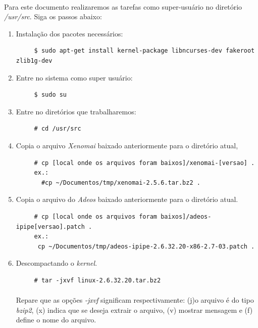 \documentclass[a4paper,10pt]{article}
\begin{document}
  \paragraph{}
    Para este documento realizaremos as tarefas como super-usuário no diretório \emph{/usr/src}. Siga os passos abaixo:
    \begin{enumerate}
      \item Instalação dos pacotes necessários:
	\begin{lstlisting}
	 $ sudo apt-get install kernel-package libncurses-dev fakeroot zlib1g-dev
	\end{lstlisting}

      \item Entre no sistema como super usuário:
	\begin{lstlisting}
	 $ sudo su 
	\end{lstlisting}

      \item Entre no diretórios que trabalharemos:
	\begin{lstlisting}
	 # cd /usr/src
	\end{lstlisting}

      \item Copia o arquivo \emph{Xenomai} baixado anteriormente para o diretório atual,
	\begin{lstlisting}
	 # cp [local onde os arquivos foram baixos]/xenomai-[versao] . 
	 ex.: 
	   #cp ~/Documentos/tmp/xenomai-2.5.6.tar.bz2 .
	\end{lstlisting}


      \item Copia o arquivo do \emph{Adeos} baixado anteriormente para o diretório atual.
	\begin{lstlisting}
	 # cp [local onde os arquivos foram baixos]/adeos-ipipe[versao].patch .
	 ex.:
	  cp ~/Documentos/tmp/adeos-ipipe-2.6.32.20-x86-2.7-03.patch .
	\end{lstlisting}

      \item Descompactando o \emph{kernel}.
	\begin{lstlisting}
	 # tar -jxvf linux-2.6.32.20.tar.bz2
	\end{lstlisting}
	\paragraph{}
	  Repare que as opções \emph{-jxvf} significam respectivamente: (j)o arquivo é do tipo \emph{bzip2}, (x) indica que se deseja 
	  extrair o arquivo, (v) mostrar mensagem e (f) define o nome do arquivo.
	  

\end{enumerate}
\end{document}
